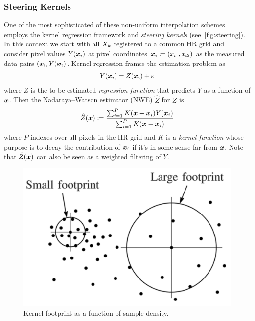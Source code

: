 \subsubsection{Steering Kernels}
One of the most sophisticated of these non-uniform interpolation schemes employs the kernel regression framework and \textit{steering kernels} (see~\ref{fig:steering}).
%
In this context we start with all \(X_k\) registered to a common HR grid and consider pixel values \(Y(\bm{x}_i)\) at pixel coordinates \(\bm{x}_i \coloneqq (x_{i1},x_{i2})\) as the measured data pairs \((\bm{x}_i, Y(\bm{x}_i)\).
%
Kernel regression frames the estimation problem as
\begin{equation}
    Y(\bm{x}_i) = Z(\bm{x}_i) + \varepsilon
\end{equation}
where \(Z\) is the to-be-estimated \textit{regression function} that predicts \(Y\) as a function of \(\bm{x}\).
Then the Nadaraya–Watson estimator (NWE)\cite{Nadaraya} \(\hat{Z}\) for \(Z\) is
\begin{equation}
    \hat{Z}(\bm{x}) \coloneqq \frac{\sum_{i=1}^{P}K(\bm{x} - \bm{x}_i)Y(\bm{x}_i)}{\sum_{i=1}^{P}K(\bm{x} - \bm{x}_i)}
    \label{eqn:kernelregression}
\end{equation}
where \(P\) indexes over all pixels in the HR grid and \(K\) is a \textit{kernel function} whose purpose is to decay the contribution of \(\bm{x}_i\) if it's in some sense far from \(\bm{x}\).
%
Note that \(\hat{Z}(\bm{x})\) can also be seen as a weighted filtering of \(Y\).
%
\begin{figure}
    \centering
    \includegraphics[width=.8\linewidth]{figures/classical/footprint.png}
    \caption{Kernel footprint as a function of sample density\cite{Takeda2007}.}
    \label{fig:footprint}
\end{figure}

